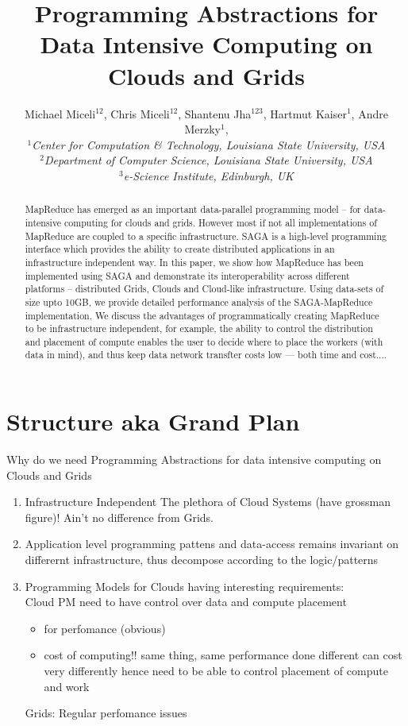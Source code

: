 \documentclass[conference,final]{IEEEtran}
\title{Programming Abstractions for Data Intensive Computing on Clouds and Grids}
\author{Michael Miceli$^{12}$, Chris Miceli$^{12}$, Shantenu
  Jha$^{123}$, Hartmut Kaiser$^{1}$, Andre Merzky$^{1}$, \\
  \small{\emph{$^{1}$Center for Computation \& Technology, Louisiana
      State University, USA}}\\
  \small{\emph{$^{2}$Department of Computer Science, Louisiana State
      University, USA}}\\
  \small{\emph{$^{3}$e-Science Institute, Edinburgh, UK}}\\
}
\begin{document}
\maketitle

\begin{abstract}
  MapReduce has emerged as an important data-parallel programming
  model -- for data-intensive computing for clouds and grids. However
  most if not all implementations of MapReduce are coupled to a
  specific infrastructure.  SAGA is a high-level programming interface
  which provides the ability to create distributed applications in an
  infrastructure independent way. In this paper, we show how MapReduce
  has been implemented using SAGA and demonstrate its interoperability
  across different platforms -- distributed Grids, Clouds and
  Cloud-like infrastructure. Using data-sets of size upto 10GB, we
  provide detailed performance analysis of the SAGA-MapReduce
  implementation.  We discuss the advantages of programmatically
  creating MapReduce to be infrastructure independent, for example,
  the ability to control the distribution and placement of compute
  enables the user to decide where to place the workers (with data in
  mind), and thus keep data network transfter costs low --- both time
  and cost....
\end{abstract}


\section{Structure aka Grand Plan}

Why do we need Programming Abstractions for data intensive 
computing on Clouds and Grids

\begin{enumerate}
\item  Infrastructure Independent
   The plethora of Cloud Systems (have grossman figure)!
   Ain't no difference from Grids.

\item Application level programming pattens and data-access remains
invariant on differernt infrastructure, thus decompose
according to the logic/patterns

\item  Programming Models for Clouds having interesting
requirements:\\
Cloud PM  need to have control over data and compute placement

\begin{itemize}
 \item for perfomance (obvious)
 \item cost of computing!!
       same thing, same performance done different can cost very differently
       hence need to be able to control placement of compute and work
\end{itemize}

Grids: Regular perfomance issues
\end{enumerate}
\end{document}
